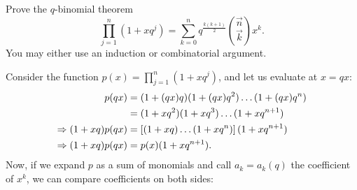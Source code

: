 \documentclass[12pt]{memoir}
\begin{document}
\begin{Ej}[Exercise 2]
   Prove the $q$-binomial theorem 
   $$\prod_{j=1}^n(1+xq^j)=\sum_{k=0}^nq^{\frac{k(k+1)}{2}}\binom{\vec{n}}{\vec{k}}x^k.$$
   You may either use an induction or combinatorial argument.
\end{Ej}

\begin{ptcbr}
    Consider the function $p(x)=\prod_{j=1}^n(1+xq^j)$, and let us evaluate at $x=qx$:
    \begin{align*}
        p(qx)&=(1+(qx)q)(1+(qx)q^2)\dots(1+(qx)q^n)\\
        &=(1+xq^2)(1+xq^3)\dots(1+xq^{n+1})\\
        \Rightarrow(1+xq)p(qx)&=\left\lbrack(1+xq)\dots(1+xq^{n})\right\rbrack(1+xq^{n+1})\\
        \Rightarrow(1+xq)p(qx)&=p(x)(1+xq^{n+1}).
    \end{align*}
    Now, if we expand $p$ as a sum of monomials and call $a_k=a_k(q)$ the coefficient of $x^k$, we can compare coefficients on both sides:
\end{ptcbr}

 
\end{document}
